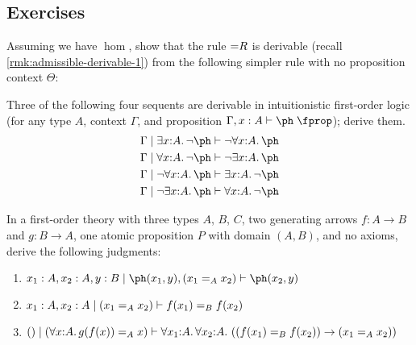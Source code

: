 


\subsection*{Exercises}

\begin{ex}\label{ex:eq-frob-from-hom}
  Assuming we have $\hom$, show that the rule $\eqR$ is derivable (recall \cref{rmk:admissible-derivable-1}) from the following simpler rule with no proposition context $\Theta$:
  \begin{mathpar}
  \end{mathpar}
\end{ex}

\begin{ex}\label{ex:quantifier-laws}
  Three of the following four sequents are derivable in intuitionistic first-order logic (for any type $A$,  context $\Gamma$, and proposition $\Gamma,x:A\types\ph\prop$); derive them.
  \begin{align*}
    \Gamma \cb \exists x:A. \neg \ph &\types \neg\forall x:A. \ph\\
    \Gamma \cb \forall x:A. \neg \ph &\types \neg\exists x:A. \ph\\
    \Gamma \cb \neg\forall x:A. \ph &\types \exists x:A. \neg \ph\\
    \Gamma \cb \neg\exists x:A. \ph &\types \forall x:A. \neg \ph
  \end{align*}
\end{ex}

\begin{ex}\label{ex:equality}
  In a first-order theory with
  three types $A$, $B$, $C$,
  two generating arrows $f : A \to B$ and $g : B \to A$,
  one atomic proposition $P$ with domain $(A,B)$, and
  no axioms,
  derive the following judgments:
  \begin{enumerate}
  \item $x_1: A, x_2 : A, y : B \cb \ph(x_1,y), (x_1 =_A x_2) \types \ph(x_2,y)$
  \item $x_1 : A, x_2 : A \cb (x_1 =_A x_2) \types f(x_1) =_B f(x_2)$
  \item $\ec \cb ( \forall x : A. g(f(x)) =_A x ) \types \forall x_1:A. \forall x_2 : A. \left((f(x_1) =_B f(x_2)) \to (x_1 =_A x_2) \right)$
  \end{enumerate}
\end{ex}

